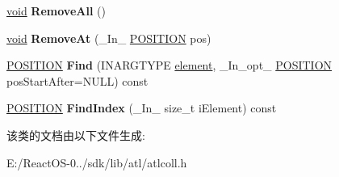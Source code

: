 \begin{DoxyCompactItemize}
\hyperlink{interfacevoid}{void} {\bfseries Remove\+All} ()
\item 
\mbox{\label{class_a_t_l_1_1_c_atl_list_ac7df01d3944ecd78e15535bc14505b53}} 
\hyperlink{interfacevoid}{void} {\bfseries Remove\+At} (\+\_\+\+In\+\_\+ \hyperlink{struct_____p_o_s_i_t_i_o_n}{P\+O\+S\+I\+T\+I\+ON} pos)
\item 
\mbox{\label{class_a_t_l_1_1_c_atl_list_aa8c2b496e5bf1337013362ec76df1402}} 
\hyperlink{struct_____p_o_s_i_t_i_o_n}{P\+O\+S\+I\+T\+I\+ON} {\bfseries Find} (I\+N\+A\+R\+G\+T\+Y\+PE \hyperlink{structelement}{element}, \+\_\+\+In\+\_\+opt\+\_\+ \hyperlink{struct_____p_o_s_i_t_i_o_n}{P\+O\+S\+I\+T\+I\+ON} pos\+Start\+After=N\+U\+LL) const
\item 
\mbox{\label{class_a_t_l_1_1_c_atl_list_a50dd2d6a90bbe26ebf4cc027ffd5a4e5}} 
\hyperlink{struct_____p_o_s_i_t_i_o_n}{P\+O\+S\+I\+T\+I\+ON} {\bfseries Find\+Index} (\+\_\+\+In\+\_\+ size\+\_\+t i\+Element) const
\end{DoxyCompactItemize}


该类的文档由以下文件生成\+:\begin{DoxyCompactItemize}
\item 
E\+:/\+React\+O\+S-\/0../sdk/lib/atl/atlcoll.\+h\end{DoxyCompactItemize}
